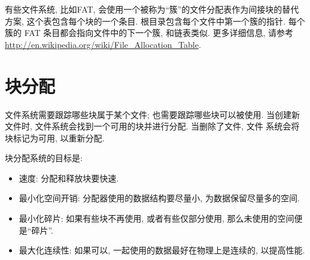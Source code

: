 \documentclass[12pt]{book}
\begin{document}
{有些文件系统, 比如FAT, 会使用一个被称为``簇''的文件分配表作为间接块的替代方案, 
这个表包含每个块的一个条目. 根目录包含每个文件中第一个簇的指针. 
每个簇的 FAT 条目都会指向文件中的下一个簇, 和链表类似. 更多详细信息, 请参考
\url{http://en.wikipedia.org/wiki/File_Allocation_Table}.


\section{块分配}

文件系统需要跟踪哪些块属于某个文件; 也需要跟踪哪些块可以被使用.
当创建新文件时, 文件系统会找到一个可用的块并进行分配. 当删除了文件, 文件
系统会将块标记为可用, 以重新分配.

块分配系统的目标是:

\begin{itemize}

\item 速度: 分配和释放块要快速.

\item 最小化空间开销: 分配器使用的数据结构要尽量小, 为数据保留尽量多的空间.

\item 最小化碎片: 如果有些块不再使用, 或者有些仅部分使用, 那么未使用的空间便是``碎片''.

\item 最大化连续性: 如果可以, 一起使用的数据最好在物理上是连续的, 以提高性能.

\end{itemize}

}
\end{document}
